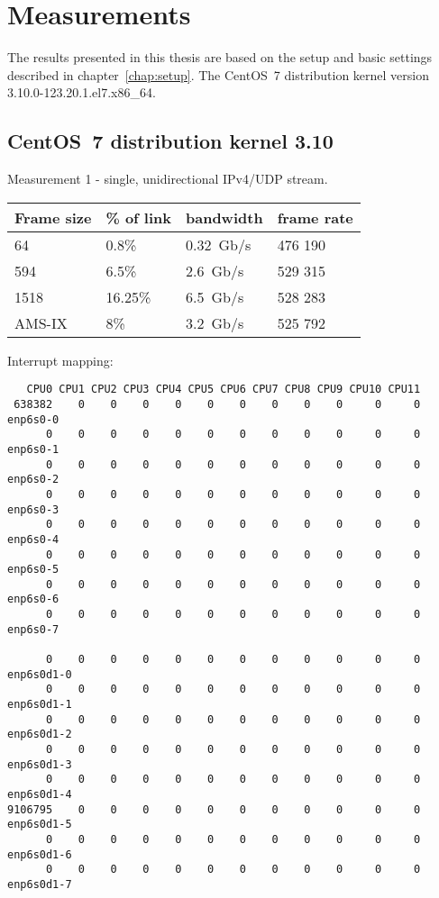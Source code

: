 
\chapter{Measurements}\label{chap:measurements}
The results presented in this thesis are based on the setup and basic settings described in chapter~\ref{chap:setup}.
The CentOS~7 distribution kernel version 3.10.0-123.20.1.el7.x86\_64.

\section{CentOS~7 distribution kernel 3.10}
Measurement 1 - single, unidirectional IPv4/UDP stream.
\begin{tabular}{ | l | l | l | l | }
\hline
Frame size & \% of link & bandwidth & frame rate \\
\hline
64     & 0.8\%   & 0.32~Gb/s & 476 190 \\ %
594    & 6.5\%   & 2.6~Gb/s  & 529 315 \\ %
1518   & 16.25\% & 6.5~Gb/s  & 528 283 \\ %
AMS-IX & 8\%     & 3.2~Gb/s  & 525 792 \\ %
\hline
\end{tabular}

Interrupt mapping:
\begin{lstlisting}
   CPU0 CPU1 CPU2 CPU3 CPU4 CPU5 CPU6 CPU7 CPU8 CPU9 CPU10 CPU11
 638382    0    0    0    0    0    0    0    0    0     0     0  enp6s0-0
      0    0    0    0    0    0    0    0    0    0     0     0  enp6s0-1
      0    0    0    0    0    0    0    0    0    0     0     0  enp6s0-2
      0    0    0    0    0    0    0    0    0    0     0     0  enp6s0-3
      0    0    0    0    0    0    0    0    0    0     0     0  enp6s0-4
      0    0    0    0    0    0    0    0    0    0     0     0  enp6s0-5
      0    0    0    0    0    0    0    0    0    0     0     0  enp6s0-6
      0    0    0    0    0    0    0    0    0    0     0     0  enp6s0-7

      0    0    0    0    0    0    0    0    0    0     0     0  enp6s0d1-0
      0    0    0    0    0    0    0    0    0    0     0     0  enp6s0d1-1
      0    0    0    0    0    0    0    0    0    0     0     0  enp6s0d1-2
      0    0    0    0    0    0    0    0    0    0     0     0  enp6s0d1-3
      0    0    0    0    0    0    0    0    0    0     0     0  enp6s0d1-4
9106795    0    0    0    0    0    0    0    0    0     0     0  enp6s0d1-5
      0    0    0    0    0    0    0    0    0    0     0     0  enp6s0d1-6
      0    0    0    0    0    0    0    0    0    0     0     0  enp6s0d1-7
\end{lstlisting}

